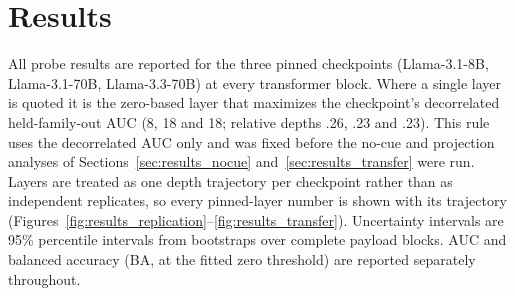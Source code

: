 %
%
%
%

\section{Results}
\label{sec:results}

All probe results are reported for the three pinned checkpoints (Llama-3.1-8B,
Llama-3.1-70B, Llama-3.3-70B) at every transformer block. Where a single layer
is quoted it is the zero-based layer that maximizes the checkpoint's
decorrelated held-family-out AUC (8, 18 and 18; relative depths .26, .23 and
.23). This rule uses the decorrelated AUC only and was fixed before the no-cue
and projection analyses of Sections~\ref{sec:results_nocue}
and~\ref{sec:results_transfer} were run. Layers are treated as one depth
trajectory per checkpoint rather than as independent replicates, so every
pinned-layer number is shown with its trajectory
(Figures~\ref{fig:results_replication}--\ref{fig:results_transfer}).
Uncertainty intervals are 95\% percentile intervals from bootstraps over
complete payload blocks. AUC and balanced accuracy (BA, at the fitted zero
threshold) are reported separately throughout.


